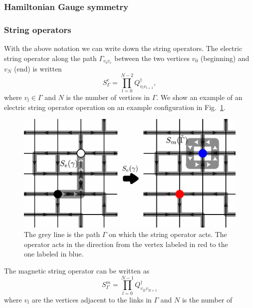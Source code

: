 \documentclass[aps,floatfix,11pt,twocolumn]{revtex4-1}
\begin{document}
        \subsubsection{Hamiltonian Gauge symmetry }


        \subsubsection{String operators}
            With the above notation we can write down the string operators. The electric string operator along
            the path $\Gamma_{v_b v_e}$ between the two vertices $v_0$ (beginning) and $v_N$ (end) is written
            \begin{equation}
                S^e_{\Gamma} = \prod_{l=0}^{N-2} Q_{v_lv_{l+1}}^\dagger
                ,
            \end{equation}
            where $v_l \in \Gamma$ and $N$ is the number of vertices in $\Gamma$. We show an example of an
            electric string operator operation on an example configuration in Fig.~\ref{fig:example_elec_string}.
            \begin{figure}[htpb]
                \centering
                \includegraphics[width=0.8\linewidth]{example_elec_string.pdf}
                \caption{The grey line is the path $\Gamma$ on which the string operator acts. The operator acts
            in the direction from the vertex labeled in red to the one labeled in blue.}
                \label{fig:example_elec_string}
            \end{figure}
            The magnetic string operator can be written as
            \begin{equation}
                S^m_{\Gamma} = \prod_{l=0}^{N-1} Q_{v_{2l}v_{2l+1}}^\dagger
            \end{equation}
            where $v_l$ are the vertices adjacent to the links in $\Gamma$ and $N$ is the number of
\end{document}
